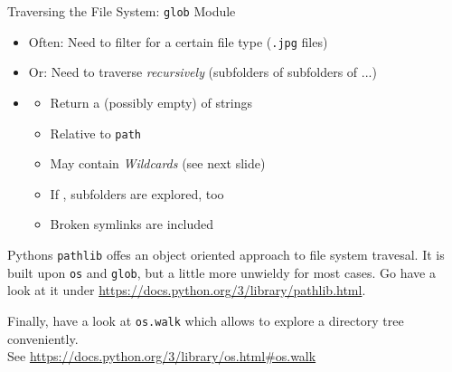 \begin{frame}[fragile]{Traversing the File System: \texttt{glob} Module}
%
\begin{itemize}
\item Often: Need to filter for a certain file type (\eg \texttt{.jpg} files)
\item Or: Need to traverse \emph{recursively} (subfolders of subfolders of ...)
\item {}
	\begin{itemize}
	\item Return a (possibly empty)  of strings
	\item Relative to \texttt{path}
	\item May contain \emph{Wildcards} (see next slide)
	\item If , subfolders are explored, too
	\item Broken symlinks are included
	\end{itemize}
\end{itemize}
%
\begin{hintbox}
\small
Pythons \texttt{pathlib} offes an object oriented approach to file system travesal. It is built upon \texttt{os} and \texttt{glob}, but a little more unwieldy for most cases. Go have a look at it under \url{https://docs.python.org/3/library/pathlib.html}.

Finally, have a look at \texttt{os.walk} which allows to explore a directory tree conveniently.\\
See \url{https://docs.python.org/3/library/os.html#os.walk}
\end{hintbox}
%
\end{frame}


